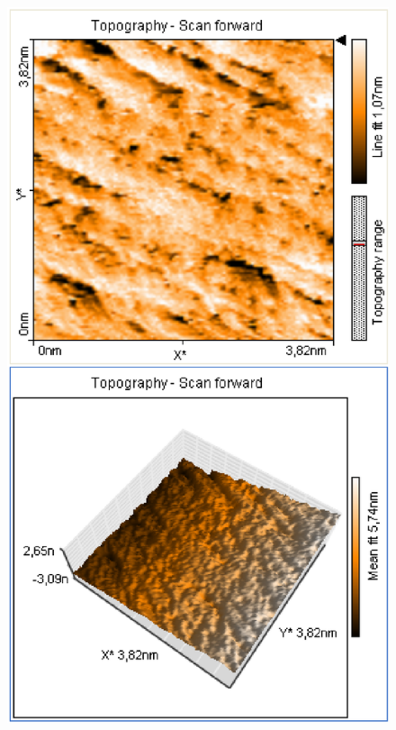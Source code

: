 \documentclass[12pt]{article}
\begin{document}
\begin{figure}[H]
\begin{minipage}{0.4\linewidth}
\includegraphics[width=0.9\linewidth]{../plot/data/mos2/mos29.eps}
\end{minipage}
\end{figure}
\end{document}
